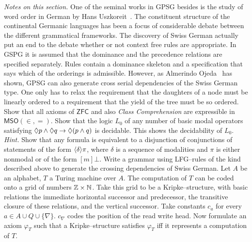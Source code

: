 {\it Notes on this section.} One of the seminal works in GPSG 
besides \cite{gazdarpullumsag:gpsg} is the study of word order 
in German 
by Hans Uszkoreit~. 
The constituent structure of the continental Germanic languages has been 
a focus of considerable debate between the different grammatical frameworks.
The discovery of Swiss German 
actually put an end to the debate
whether or not context free rules are appropriate. In GSPG it is
assumed that the dominance and the precedence relations are
specified separately. Rules contain a dominance skeleton and a
specification that says which of the orderings is admissible.
However, as Almerindo Ojeda~ has shown,
GPSG can also generate cross serial dependencies of the Swiss
German type. One only has to relax the requirement that the
daughters of a node must be linearly ordered to a requirement that
the yield of the tree must be so ordered.
\vplatz 
\exercise 
Show that all axioms of $\mathsf{ZFC}$ and also {\sl Class Comprehension} 
are expressible in $\mathsf{MSO}(\boldsymbol{\in}, \boldsymbol{=})$.
\vplatz 
\exercise 
Show that the logic $L_0$ of any number of basic
modal operators satisfying $\lozenge p \wedge \lozenge q \rightarrow \lozenge (p \wedge q)$
is decidable. This shows the decidability of $L_0$. {\it Hint.}
Show that any formula is equivalent to a disjunction of
conjunctions of statements of the form $\langle \delta\rangle\pi$, where
$\delta$ is a sequence of modalities and $\pi$ is either nonmodal
or of the form $[m]\bot$.
\vplatz 
\exercise 
Write a grammar using LFG--rules of the kind described above to 
generate the crossing dependencies of Swiss German.
\vplatz 
\exercise 
Let $A$ be an alphabet, $T$ a Turing machine over $A$. The computation 
of $T$ can be coded onto a grid of numbers $\mathbb{Z} \times \mathbb{N}$. Take this 
grid to be a Kripke--structure, with basic relations the immediate 
horizontal successor and predecessor, the transitive closure of these
relations, and the vertical successor. Take constants $c_a$ for
every $a \in A \cup Q \cup \{\nabla\}$. $c_{\nabla}$ codes the
position of the read write head. Now formulate an axiom
$\varphi_T$ such that a Kripke--structure satisfies $\varphi_T$ 
iff it represents a computation of $T$.
